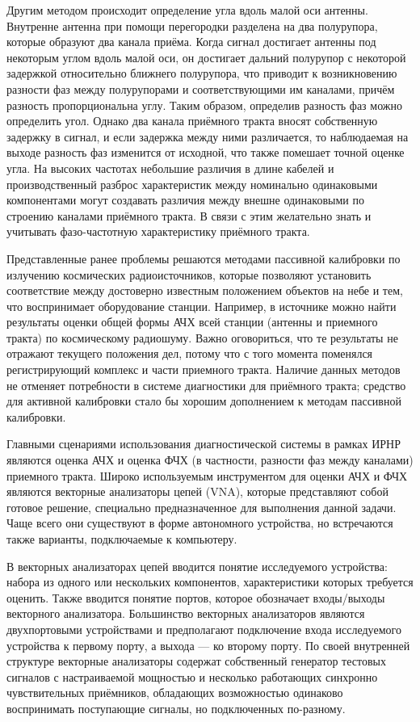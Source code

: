 \documentclass{report}
\begin{document}
Другим методом происходит определение угла вдоль малой оси антенны. Внутренне антенна при помощи перегородки разделена на два полурупора, которые образуют два канала приёма. Когда сигнал достигает антенны под некоторым углом вдоль малой оси, он достигает дальний полурупор с некоторой задержкой относительно ближнего полурупора, что приводит к возникновению разности фаз между полурупорами и соответствующими им каналами, причём разность пропорциональна углу. Таким образом, определив разность фаз можно определить угол. Однако два канала приёмного тракта вносят собственную задержку в сигнал, и если задержка между ними различается, то наблюдаемая на выходе разность фаз изменится от исходной, что также помешает точной оценке угла. На высоких частотах небольшие различия в длине кабелей и производственный разброс характеристик между номинально одинаковыми компонентами могут создавать различия между внешне одинаковыми по строению каналами приёмного тракта. В связи с этим желательно знать и учитывать фазо-частотную характеристику приёмного тракта.

Представленные ранее проблемы решаются методами пассивной калибровки по излучению космических радиоисточников, которые позволяют установить соответствие между достоверно известным положением объектов на небе и тем, что воспринимает оборудование станции. Например, в источнике \cite{irnr_skynoise} можно найти результаты оценки общей формы АЧХ всей станции (антенны и приемного тракта) по космическому радиошуму. Важно оговориться, что те результаты не отражают текущего положения дел, потому что с того момента поменялся регистрирующий комплекс и части приемного тракта. Наличие данных методов не отменяет потребности в системе диагностики для приёмного тракта; средство для активной калибровки стало бы хорошим дополнением к методам пассивной калибровки.

Главными сценариями использования диагностической системы в рамках ИРНР являются оценка АЧХ и оценка ФЧХ (в частности, разности фаз между каналами) приемного тракта. Широко используемым инструментом для оценки АЧХ и ФЧХ являются векторные анализаторы цепей (VNA), которые представляют собой готовое решение, специально предназначенное для выполнения данной задачи. Чаще всего они существуют в форме автономного устройства, но встречаются также варианты, подключаемые к компьютеру.

В векторных анализаторах цепей вводится понятие исследуемого устройства: набора из одного или нескольких компонентов, характеристики которых требуется оценить. Также вводится понятие портов, которое обозначает входы/выходы векторного анализатора. Большинство векторных анализаторов являются двухпортовыми устройствами и предполагают подключение входа исследуемого устройства к первому порту, а выхода --- ко второму порту. По своей внутренней структуре векторные анализаторы содержат собственный генератор тестовых сигналов с настраиваемой мощностью и несколько работающих синхронно чувствительных приёмников, обладающих возможностью одинаково воспринимать поступающие сигналы, но подключенных по-разному.
\end{document}
